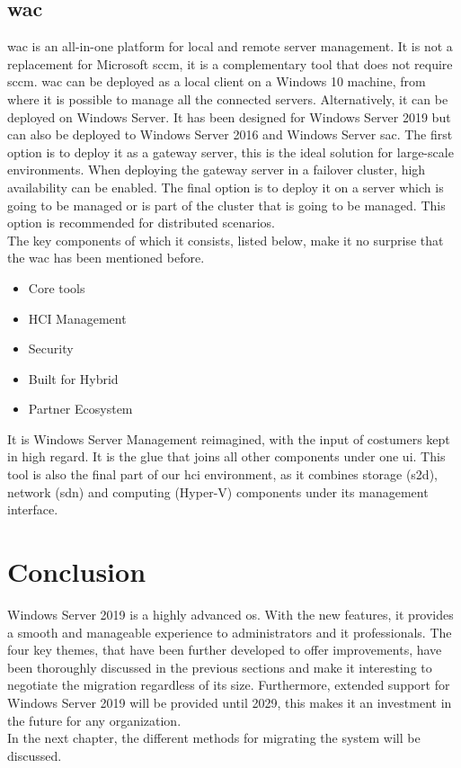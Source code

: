 \subsection{\acrfull{wac}}
\acrlong{wac} is an all-in-one platform for local and remote server management.
It is not a replacement for Microsoft \acrfull{sccm}, it is a complementary tool that does not require \acrshort{sccm}.	
\acrshort{wac} can be deployed as a local client on a Windows 10 machine, from where it is possible to manage all the connected servers. 
Alternatively, it can be deployed on Windows Server. 
It has been designed for Windows Server 2019 but can also be deployed to Windows Server 2016 and Windows Server \acrshort{sac}.
The first option is to deploy it as a gateway server, this is the ideal solution for large-scale environments.
When deploying the gateway server in a failover cluster, high availability can be enabled. 
The final option is to deploy it on a server which is going to be managed or is part of the cluster that is going to be managed. 
This option is recommended for distributed scenarios.\\
The key components of which it consists, listed below, make it no surprise that the \acrlong{wac} has been mentioned before. 
\begin{itemize}
	\item Core tools
	\item HCI Management
	\item Security
	\item Built for Hybrid
	\item Partner Ecosystem
\end{itemize}
It is Windows Server Management reimagined, with the input of costumers kept in high regard. 
It is the glue that joins all other components under one \acrfull{ui}. 
This tool is also the final part of our \acrshort{hci} environment, as it combines storage (\acrshort{s2d}), network (\acrshort{sdn}) and computing (Hyper-V) components under its management interface. 

\section{Conclusion}

Windows Server 2019 is a highly advanced \acrshort{os}. 
With the new features, it provides a smooth and manageable experience to administrators and \acrshort{it} professionals.
The four key themes, that have been further developed to offer improvements, have been thoroughly discussed in the previous sections and make it interesting to negotiate the migration regardless of its size.
Furthermore, extended support for Windows Server 2019 will be provided until 2029, this makes it an investment in the future for any organization.\\
In the next chapter, the different methods for migrating the system will be discussed.
